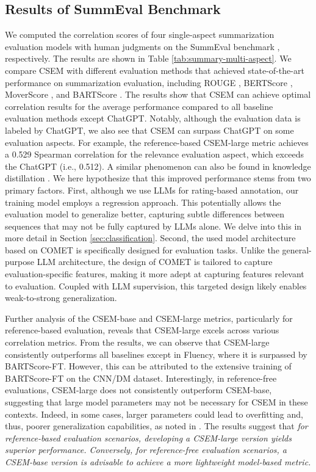 \documentclass[lettersize,journal]{IEEEtran}
\begin{document}
\subsection{Results of SummEval Benchmark}
We computed the correlation scores of four single-aspect summarization evaluation models with human judgments on the SummEval benchmark \cite{fabbri2021summeval}, respectively. The results are shown in Table \ref{tab:summary-multi-aspect}. We compare CSEM with different evaluation methods that achieved state-of-the-art performance on summarization evaluation, including ROUGE \cite{lin2004rouge}, BERTScore \cite{zhang2019bertscore}, MoverScore \cite{zhao2019moverscore}, and BARTScore \cite{yuan2021bartscore}. The results show that CSEM can achieve optimal correlation results for the average performance compared to all baseline evaluation methods except ChatGPT. Notably, although the evaluation data is labeled by ChatGPT, we also see that CSEM can surpass ChatGPT on some evaluation aspects. For example, the reference-based CSEM-large metric achieves a 0.529 Spearman correlation for the relevance evaluation aspect, which exceeds the ChatGPT (i.e., 0.512). A similar phenomenon can also be found in knowledge distillation \cite{wang2021niutrans,burns2023weak}. We here hypothesize that this improved performance stems from two primary factors. First, although we use LLMs for rating-based annotation, our training model employs a regression approach. This potentially allows the evaluation model to generalize better, capturing subtle differences between sequences that may not be fully captured by LLMs alone. We delve into this in more detail in Section \ref{sec:classification}. Second, the used model architecture based on COMET is specifically designed for evaluation tasks. Unlike the general-purpose LLM architecture, the design of COMET is tailored to capture evaluation-specific features, making it more adept at capturing features relevant to evaluation. Coupled with LLM supervision, this targeted design likely enables weak-to-strong generalization.

Further analysis of the CSEM-base and CSEM-large metrics, particularly for reference-based evaluation, reveals that CSEM-large excels across various correlation metrics. From the results, we can observe that CSEM-large consistently outperforms all baselines except in Fluency, where it is surpassed by BARTScore-FT. However, this can be attributed to the extensive training of BARTScore-FT on the CNN/DM dataset. Interestingly, in reference-free evaluations, CSEM-large does not consistently outperform CSEM-base, suggesting that large model parameters may not be necessary for CSEM in these contexts. Indeed, in some cases, larger parameters could lead to overfitting and, thus, poorer generalization capabilities, as noted in \cite{rei2023scaling}. The results suggest that \textit{for reference-based evaluation scenarios, developing a CSEM-large version yields superior performance. Conversely, for reference-free evaluation scenarios, a CSEM-base version is advisable to achieve a more lightweight model-based metric.}
\end{document}
